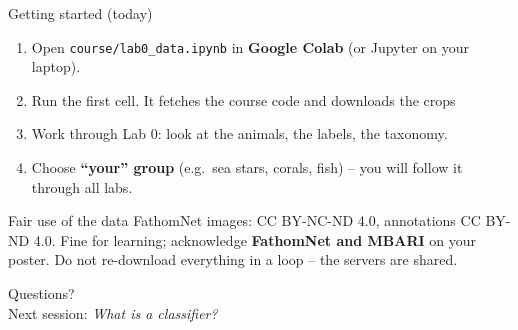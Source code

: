 \documentclass[aspectratio=169,11pt]{beamer}
\begin{document}
\begin{frame}[fragile]{Getting started (today)}
\begin{enumerate}
  \item Open \texttt{course/lab0\_data.ipynb} in \textbf{Google Colab} (or Jupyter on your laptop).
  \item Run the first cell. It fetches the course code and downloads the crops\\
  \item Work through Lab 0: look at the animals, the labels, the taxonomy.
  \item Choose \textbf{``your'' group} (e.g.\ sea stars, corals, fish) -- you will follow it through all labs.
\end{enumerate}
\vspace{4pt}
\begin{exampleblock}{Fair use of the data}
FathomNet images: CC BY-NC-ND 4.0, annotations CC BY-ND 4.0. Fine for learning; acknowledge \textbf{FathomNet and MBARI} on your poster. Do not re-download everything in a loop -- the servers are shared.
\end{exampleblock}
\end{frame}

\begin{frame}[standout]
Questions?\\[8pt]
\normalsize Next session: \emph{What is a classifier?}
\end{frame}
\end{document}
